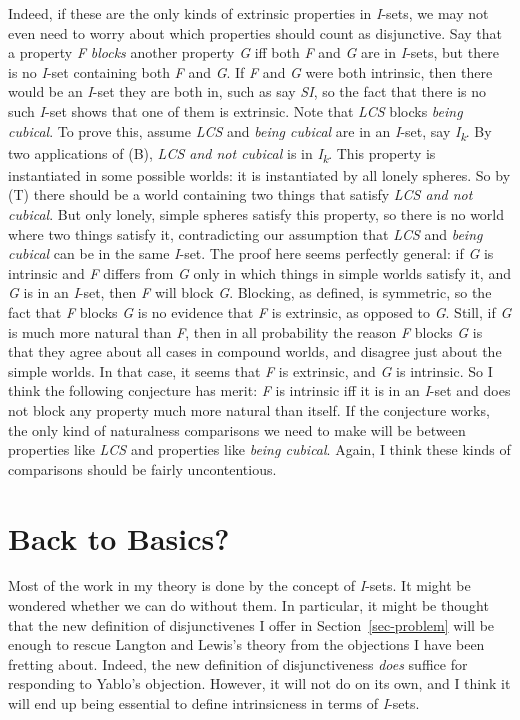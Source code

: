 \documentclass[
  11pt,
  letterpaper,
  DIV=11,
  numbers=noendperiod,
  twoside]{scrartcl}
\begin{document}
Indeed, if these are the only kinds of extrinsic properties in
\emph{I}-sets, we may not even need to worry about which properties
should count as disjunctive. Say that a property \emph{F} \emph{blocks}
another property \emph{G} iff both \emph{F} and \emph{G} are in
\emph{I}-sets, but there is no \emph{I}-set containing both \emph{F} and
\emph{G}. If \emph{F} and \emph{G} were both intrinsic, then there would
be an \emph{I}-set they are both in, such as say \emph{SI}, so the fact
that there is no such \emph{I}-set shows that one of them is extrinsic.
Note that \emph{LCS} blocks \emph{being cubical}. To prove this, assume
\emph{LCS} and \emph{being cubical} are in an \emph{I}-set, say
\emph{I\textsubscript{k}}. By two applications of (B), \emph{LCS and not
cubical} is in \emph{I\textsubscript{k}}. This property is instantiated
in some possible worlds: it is instantiated by all lonely spheres. So by
(T) there should be a world containing two things that satisfy \emph{LCS
and not cubical}. But only lonely, simple spheres satisfy this property,
so there is no world where two things satisfy it, contradicting our
assumption that \emph{LCS} and \emph{being cubical} can be in the same
\emph{I}-set. The proof here seems perfectly general: if \emph{G} is
intrinsic and \emph{F} differs from \emph{G} only in which things in
simple worlds satisfy it, and \emph{G} is in an \emph{I}-set, then
\emph{F} will block \emph{G}. Blocking, as defined, is symmetric, so the
fact that \emph{F} blocks \emph{G} is no evidence that \emph{F} is
extrinsic, as opposed to \emph{G}. Still, if \emph{G} is much more
natural than \emph{F}, then in all probability the reason \emph{F}
blocks \emph{G} is that they agree about all cases in compound worlds,
and disagree just about the simple worlds. In that case, it seems that
\emph{F} is extrinsic, and \emph{G} is intrinsic. So I think the
following conjecture has merit: \emph{F} is intrinsic iff it is in an
\emph{I}-set and does not block any property much more natural than
itself. If the conjecture works, the only kind of naturalness
comparisons we need to make will be between properties like \emph{LCS}
and properties like \emph{being cubical}. Again, I think these kinds of
comparisons should be fairly uncontentious.

\section{Back to Basics?}\label{back-to-basics}

Most of the work in my theory is done by the concept of \emph{I}-sets.
It might be wondered whether we can do without them. In particular, it
might be thought that the new definition of disjunctivenes I offer in
Section~\ref{sec-problem} will be enough to rescue Langton and Lewis's
theory from the objections I have been fretting about. Indeed, the new
definition of disjunctiveness \emph{does} suffice for responding to
Yablo's objection. However, it will not do on its own, and I think it
will end up being essential to define intrinsicness in terms of
\emph{I}-sets.
\end{document}
